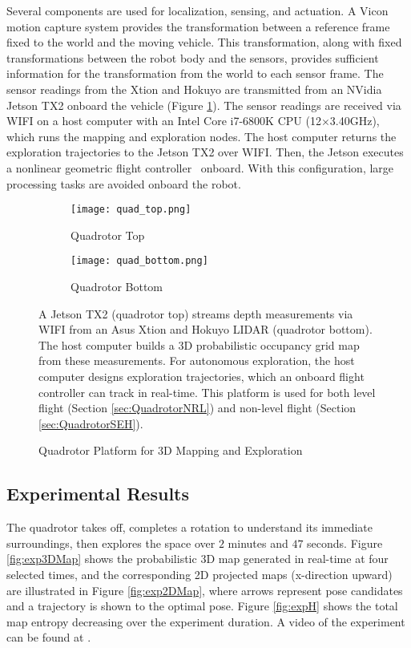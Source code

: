 Several components are used for localization, sensing, and actuation. A Vicon motion capture system provides the transformation between a reference frame fixed to the world and the moving vehicle. This transformation, along with fixed transformations between the robot body and the sensors, provides sufficient information for the transformation from the world to each sensor frame. The sensor readings from the Xtion and Hokuyo are transmitted from an NVidia Jetson TX2 onboard the vehicle (Figure \ref{fig:QuadrotorHardware}). The sensor readings are received via WIFI on a host computer with an Intel Core i7-6800K CPU (12$\times$3.40GHz), which runs the mapping and exploration nodes. The host computer returns the exploration trajectories to the Jetson TX2 over WIFI. Then, the Jetson executes a nonlinear geometric flight controller~\cite{GooDaeLee13} onboard. With this configuration, large processing tasks are avoided onboard the robot.
		
\begin{figure}[!t]
\centering
    	\begin{subfigure}[t]{0.44\columnwidth}
           	\centering
          	\texttt{[image: quad\_top.png]}
        		\caption{Quadrotor Top}
    	\end{subfigure}
	\hspace*{0.05\columnwidth}
    	\begin{subfigure}[t]{0.44\columnwidth}
           	\centering
          	\texttt{[image: quad\_bottom.png]}
        		\caption{Quadrotor Bottom}
    	\end{subfigure}
	\caption{Quadrotor Platform for 3D Mapping and Exploration}
	\medskip
	\small
	A Jetson TX2 (quadrotor top) streams depth measurements via WIFI from an Asus Xtion and Hokuyo LIDAR (quadrotor bottom). The host computer builds a 3D probabilistic occupancy grid map from these measurements. For autonomous exploration, the host computer designs exploration trajectories, which an onboard flight controller can track in real-time. This platform is used for both level flight (Section \ref{sec:QuadrotorNRL}) and non-level flight (Section \ref{sec:QuadrotorSEH}).
	\label{fig:QuadrotorHardware}
\end{figure}

\subsection{Experimental Results}
                
The quadrotor takes off, completes a rotation to understand its immediate surroundings, then explores the space over $2$ minutes and $47$ seconds. Figure \ref{fig:exp3DMap} shows the probabilistic 3D map generated in real-time at four selected times, and the corresponding 2D projected maps (x-direction upward) are illustrated in Figure \ref{fig:exp2DMap}, where arrows represent pose candidates and a trajectory is shown to the optimal pose. Figure \ref{fig:expH} shows the total map entropy decreasing over the experiment duration. A video of the experiment can be found at \href{https://www.youtube.com/watch?v=I_1rXV2XRqk}{}.

